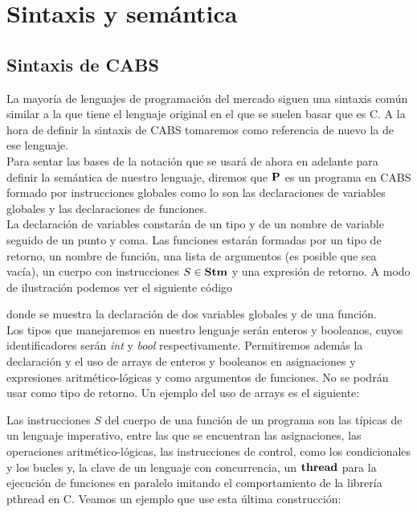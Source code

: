 \chapter{Sintaxis y semántica}
\section{Sintaxis de CABS}
La mayoría de lenguajes de programación del mercado siguen una sintaxis común similar a la que tiene el lenguaje original en el que se suelen basar que es C. A la hora de definir la sintaxis de CABS tomaremos como referencia de nuevo la de ese lenguaje.\\

Para sentar las bases de la notación que se usará de ahora en adelante para definir la semántica de nuestro lenguaje, diremos que $\P$ es un programa en CABS formado por instrucciones globales como lo son las declaraciones de variables globales y las declaraciones de funciones.\\

La declaración de variables constarán de un tipo y de un nombre de variable seguido de un punto y coma. Las funciones estarán formadas por un tipo de retorno, un nombre de función, una lista de argumentos (es posible que sea vacía), un cuerpo con instrucciones $S \in \Stm$ y una expresión de retorno. A modo de ilustración podemos ver el siguiente código



donde se muestra la declaración de dos variables globales y de una función.\\

Los tipos que manejaremos en nuestro lenguaje serán enteros y booleanos, cuyos identificadores serán \emph{int} y \emph{bool} respectivamente. Permitiremos además la declaración y el uso de arrays de enteros y booleanos en asignaciones y expresiones aritmético-lógicas y como argumentos de funciones. No se podrán usar como tipo de retorno. Un ejemplo del uso de arrays es el siguiente:



Las instrucciones $S$ del cuerpo de una función de un programa son las típicas de un lenguaje imperativo, entre las que se encuentran las asignaciones, las operaciones aritmético-lógicas, las instrucciones de control, como los condicionales y los bucles y, la clave de un lenguaje con concurrencia, un $\thread$ para la ejecución de funciones en paralelo imitando el comportamiento de la librería pthread en C. Veamos un ejemplo que use esta última construcción:

